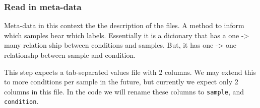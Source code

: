 \documentclass[
  letterpaper,
  DIV=11,
  numbers=noendperiod]{scrartcl}
\newenvironment{Shaded}{\begin{snugshade}}{\end{snugshade}}
\newcommand{\AttributeTok}[1]{\textcolor[rgb]{0.40,0.45,0.13}{#1}}
\newcommand{\ConstantTok}[1]{\textcolor[rgb]{0.56,0.35,0.01}{#1}}
\newcommand{\FunctionTok}[1]{\textcolor[rgb]{0.28,0.35,0.67}{#1}}
\newcommand{\NormalTok}[1]{\textcolor[rgb]{0.00,0.23,0.31}{#1}}
\newcommand{\OtherTok}[1]{\textcolor[rgb]{0.00,0.23,0.31}{#1}}
\newcommand{\SpecialCharTok}[1]{\textcolor[rgb]{0.37,0.37,0.37}{#1}}
\newcommand{\StringTok}[1]{\textcolor[rgb]{0.13,0.47,0.30}{#1}}
\begin{document}
\hypertarget{read-in-meta-data}{%
\subsubsection{Read in meta-data}\label{read-in-meta-data}}

Meta-data in this context the the description of the files. A method to
inform which samples bear which labels. Essentially it is a dicionary
that has a one -\textgreater{} many relation ship between conditions and
samples. But, it has one -\textgreater{} one relationshp between sample
and condition.

This step expects a tab-separated values file with 2 columns. We may
extend this to more conditions per sample in the future, but currently
we expect only 2 columns in this file. In the code we will rename these
columns to \texttt{sample}, and \texttt{condition}.

\begin{Shaded}
\end{Shaded}
\end{document}
